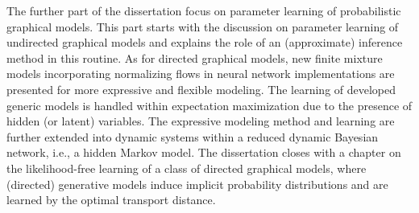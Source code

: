 The further part of the dissertation focus on parameter learning of probabilistic graphical models. This part starts with the discussion on parameter learning of undirected graphical models and explains the role of an (approximate) inference method in this routine. As for directed graphical models, new finite mixture models incorporating normalizing flows in neural network implementations are presented for more expressive and flexible modeling. The learning of developed generic models is handled within expectation maximization due to the presence of hidden (or latent) variables. The expressive modeling method and learning are further extended into dynamic systems within a reduced dynamic Bayesian network, i.e., a hidden Markov model. The dissertation closes with a chapter on the likelihood-free learning of a class of directed graphical models, where (directed) generative models induce implicit probability distributions and are learned by the optimal transport distance.


